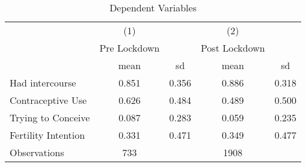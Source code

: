 \begin{table}[htbp]\centering
\def\sym#1{\ifmmode^{#1}\else\(^{#1}\)\fi}
\caption{Dependent Variables}
\begin{tabular}{l*{2}{cc}}
\hline\hline
                    &\multicolumn{1}{c}{(1)}&            &\multicolumn{1}{c}{(2)}&            \\
                    &Pre Lockdown&            &Post Lockdown&            \\
                    &        mean&          sd&        mean&          sd\\
\hline
Had intercourse     &       0.851&       0.356&       0.886&       0.318\\
Contraceptive Use   &       0.626&       0.484&       0.489&       0.500\\
Trying to Conceive  &       0.087&       0.283&       0.059&       0.235\\
Fertility Intention &       0.331&       0.471&       0.349&       0.477\\
\hline
Observations        &         733&            &        1908&            \\
\hline\hline
\end{tabular}
\end{table}
